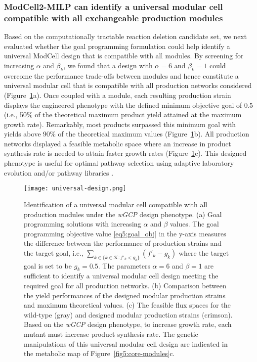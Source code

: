 \subsubsection{ModCell2-MILP can identify a universal modular cell compatible with all exchangeable production modules} \label{sec:universal_design}
Based on the computationally tractable reaction deletion candidate set, we next evaluated whether the goal programming formulation could help identify a universal ModCell design that is compatible with all modules.
By screening for increasing $\alpha$ and $\beta_k$, we found that a design with $\alpha=6$ and $\beta_k=1$ could overcome the performance trade-offs between modules and hence constitute a universal modular cell that is compatible with all production networks considered (Figure~\ref{fig5:universal-design}a). Once coupled with a module, each resulting production strain displays the engineered phenotype with the defined minimum objective goal of 0.5 (i.e., 50\% of the theoretical maximum product yield attained at the maximum growth rate).
Remarkably, most products surpassed this minimum goal with yields above 90\% of the theoretical maximum values (Figure~\ref{fig5:universal-design}b). All production networks displayed a feasible metabolic space where an increase in product synthesis rate is needed to attain faster growth rates (Figure~\ref{fig5:universal-design}c). This designed phenotype is useful for optimal pathway selection using adaptive laboratory evolution \citep{fong2005, trinh2009b} and/or pathway libraries \citep{garst2017}.

\begin{figure}[p]
    \caption[Identification of a universal modular cell compatible with all production modules under the \textit{wGCP} design phenotype]{Identification of a universal modular cell compatible with all production modules under the \textit{wGCP} design phenotype. (a) Goal programming solutions with increasing $\alpha$ and $\beta$ values. The goal programming objective value \eqref{eq5:goal_obj} in the y-axis measures the difference between the performance of production strains and the target goal, i.e., $\sum_{k\in \{ k \in \mathcal{K}: f'_k < g_k\}}(f'_k - g_k)$ where the target goal is set to be $g_k=0.5$. The parameters $\alpha=6$ and $\beta=1$ are sufficient to identify a universal modular cell design meeting the required goal for all production networks. (b) Comparison between the yield performances of the designed modular production strains and maximum theoretical values. (c) The feasible flux spaces for the wild-type (gray) and designed modular production strains (crimson). Based on the \textit{wGCP} design phenotype, to increase growth rate, each mutant must increase product synthesis rate. The genetic manipulations of this universal modular cell design are indicated in the metabolic map of Figure~\ref{fig5:core-modules}c.}
    \centering
    \texttt{[image: universal-design.png]}
    \label{fig5:universal-design}
\end{figure}

